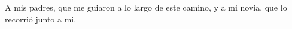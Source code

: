 \begin{dedication}
A mis padres, que me guiaron a lo largo de este camino, y a mi novia, que lo recorrió junto a mi.
\end{dedication}
